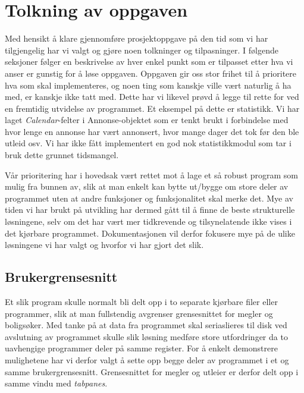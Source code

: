 \section{Tolkning av oppgaven}
Med hensikt å klare gjennomføre prosjektoppgave på den tid som vi har tilgjengelig har vi valgt og gjøre noen tolkninger og tilpasninger. I følgende seksjoner følger en beskrivelse av hver enkel punkt som er tilpasset etter hva vi anser er gunstig for å løse oppgaven.
Oppgaven gir oss stor frihet til å prioritere hva som skal implementeres, og noen ting som kanskje ville vært naturlig å ha med, er kanskje ikke tatt med. Dette har vi likevel prøvd å legge til rette for ved en fremtidig utvidelse av programmet. 
Et eksempel på dette er statistikk. Vi har laget \emph{Calendar}-felter i Annonse-objektet som er tenkt brukt i forbindelse med hvor lenge en annonse har vært annonsert, hvor mange dager det tok før den ble utleid osv. Vi har ikke fått implementert en god nok statistikkmodul som tar i bruk dette grunnet tidsmangel.

Vår prioritering har i hovedsak vært rettet mot å lage et så robust program som mulig fra bunnen av, slik at man enkelt kan bytte ut/bygge om store deler av programmet uten at andre funksjoner og funksjonalitet skal merke det.
Mye av tiden vi har brukt på utvikling har dermed gått til å finne de beste strukturelle løsningene, selv om det har vært mer tidkrevende og tilsynelatende ikke vises i det kjørbare programmet. 
Dokumentasjonen vil derfor fokusere mye på de ulike løsningene vi har valgt og hvorfor vi har gjort det slik.

\subsection{Brukergrensesnitt}
Et slik program skulle normalt bli delt opp i to separate kjørbare filer eller programmer, slik at man fullstendig avgrenser grensesnittet for megler og boligsøker. Med tanke på at data fra programmet skal seriaslieres til disk ved avslutning av programmet skulle slik løsning medføre store utfordringer da to uavhengige programmer deler på samme register. For å enkelt demonstrere mulighetene har vi derfor valgt å sette opp begge deler av programmet i et og samme brukergrensesnitt. Grensesnittet for megler og utleier er derfor delt opp i samme vindu med \emph{tabpanes}. 

